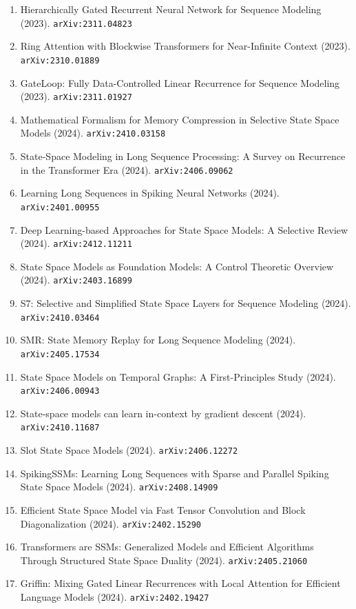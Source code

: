 \documentclass[11pt]{article}
\begin{document}
\begin{enumerate}
  \item Hierarchically Gated Recurrent Neural Network for Sequence Modeling (2023). \texttt{arXiv:2311.04823}
  \item Ring Attention with Blockwise Transformers for Near-Infinite Context (2023). \texttt{arXiv:2310.01889}
  \item GateLoop: Fully Data-Controlled Linear Recurrence for Sequence Modeling (2023). \texttt{arXiv:2311.01927}
  \item Mathematical Formalism for Memory Compression in Selective State Space
  Models (2024). \texttt{arXiv:2410.03158}
  \item State-Space Modeling in Long Sequence Processing: A Survey on Recurrence in the Transformer Era (2024). \texttt{arXiv:2406.09062}
  \item Learning Long Sequences in Spiking Neural Networks (2024). \texttt{arXiv:2401.00955}
  \item Deep Learning-based Approaches for State Space Models: A Selective
  Review (2024). \texttt{arXiv:2412.11211}
  \item State Space Models as Foundation Models: A Control Theoretic Overview (2024). \texttt{arXiv:2403.16899}
  \item S7: Selective and Simplified State Space Layers for Sequence Modeling (2024). \texttt{arXiv:2410.03464}
  \item SMR: State Memory Replay for Long Sequence Modeling (2024). \texttt{arXiv:2405.17534}
  \item State Space Models on Temporal Graphs: A First-Principles Study (2024). \texttt{arXiv:2406.00943}
  \item State-space models can learn in-context by gradient descent (2024). \texttt{arXiv:2410.11687}
  \item Slot State Space Models (2024). \texttt{arXiv:2406.12272}
  \item SpikingSSMs: Learning Long Sequences with Sparse and Parallel Spiking
  State Space Models (2024). \texttt{arXiv:2408.14909}
  \item Efficient State Space Model via Fast Tensor Convolution and Block
  Diagonalization (2024). \texttt{arXiv:2402.15290}
  \item Transformers are SSMs: Generalized Models and Efficient Algorithms
  Through Structured State Space Duality (2024). \texttt{arXiv:2405.21060}
  \item Griffin: Mixing Gated Linear Recurrences with Local Attention for
  Efficient Language Models (2024). \texttt{arXiv:2402.19427}

\end{enumerate}
\end{document}
